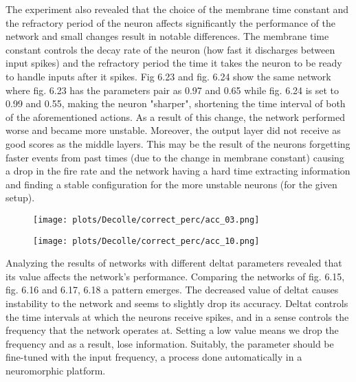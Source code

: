 \documentclass[12pt]{report}
\begin{document}
The experiment also revealed that the choice of the membrane time constant and the refractory period of the neuron affects significantly the performance of the network and small changes result in notable differences. The membrane time constant controls the decay rate of the neuron (how fast it discharges between input spikes) and the refractory period the time it takes the neuron to be ready to handle inputs after it spikes. Fig 6.23 and fig. 6.24 show the same network where fig. 6.23 has the parameters pair as 0.97 and 0.65 while fig. 6.24 is set to 0.99 and 0.55, making the neuron "sharper", shortening the time interval of both of the aforementioned actions. As a result of this change, the network performed worse and became more unstable. Moreover, the output layer did not receive as good scores as the middle layers. This may be the result of the neurons forgetting faster events from past times (due to the change in membrane constant) causing a drop in the fire rate and the network having a hard time extracting information and finding a stable configuration for the more unstable neurons (for the given setup).

\begin{figure}
\centering
\begin{minipage}{.4\textwidth}
  \centering
  \texttt{[image: plots/Decolle/correct\_perc/acc\_03.png]}
  \label{fig:test1}
\end{minipage}
\begin{minipage}{.4\textwidth}
  \centering
  \texttt{[image: plots/Decolle/correct\_perc/acc\_10.png]}
  \label{fig:test2}
\end{minipage}
\end{figure}

Analyzing the results of networks with different deltat parameters revealed that its value affects the network's performance. Comparing the networks of fig. 6.15, fig. 6.16 and 6.17, 6.18 a pattern emerges. The decreased value of deltat causes instability to the network and seems to slightly drop its accuracy. Deltat controls the time intervals at which the neurons receive spikes, and in a sense controls the frequency that the network operates at. Setting a low value means we drop the frequency and as a result, lose information. Suitably, the parameter should be fine-tuned with the input frequency, a process done automatically in a neuromorphic platform.
\end{document}
